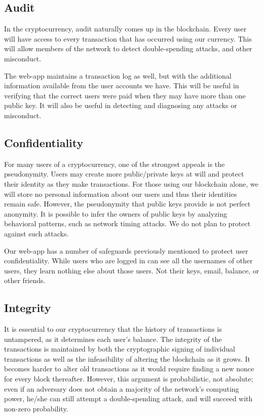 \documentclass[12pt]{article}
\begin{document}
\subsection{Audit}

In the cryptocurrency, audit naturally comes up in the blockchain. Every user will have access to every transaction that has occurred using our currency. This will allow members of the network to detect double-spending attacks, and other misconduct.

The web-app maintains a transaction log as well, but with the additional information available from the user accounts we have.
This will be useful in verifying that the correct users were paid when they may have more than one public key. It will also be useful in detecting and diagnosing any attacks or misconduct.

\subsection{Confidentiality}

For many users of a cryptocurrency, one of the strongest appeals is the pseudonymity.
Users may create more public/private keys at will and protect their identity as they make transactions.
For those using our blockchain alone, we will store no personal information about our users and thus their identities remain safe.
However, the pseudonymity that public keys provide is not perfect anonymity. It is possible to infer the owners of public keys by analyzing behavioral patterns, such as network timing attacks. We do not plan to protect against such attacks.

Our web-app has a number of safeguards previously mentioned to protect user confidentiality. While users who are logged in can see all the usernames of other users, they learn nothing else about those users. Not their keys, email, balance, or other friends.

\subsection{Integrity}

It is essential to our cryptocurrency that the history of transactions is untampered, as it determines each user's balance.
The integrity of the transactions is maintained by both the cryptographic signing of individual transactions as well as the infeasibility of altering the blockchain as it grows.
It becomes harder to alter old transactions as it would require finding a new nonce for every block thereafter.
However, this argument is probabilistic, not absolute; even if an adversary does not obtain a majority of the network's computing power, he/she can still attempt a double-spending attack, and will succeed with non-zero probability.
\end{document}
